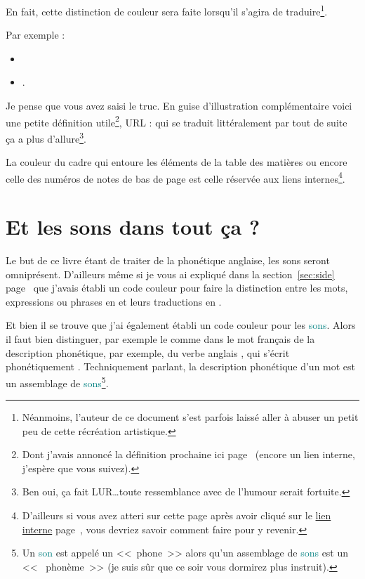 En fait, cette distinction de couleur sera faite lorsqu'il s'agira de
traduire\footnote{Néanmoins, l'auteur de ce document s'est parfois 
  laissé aller à abuser un petit peu de cette récréation artistique.}.

Par exemple :
\begin{itemize}
\item {}
\item {}.  
\end{itemize}

Je pense que vous avez saisi le truc. En guise d'illustration
complémentaire voici une petite définition utile\footnote{Dont j'avais
annoncé la définition prochaine ici page~\pageref{sec:link} (encore un
lien interne, j'espère que vous suivez).}, URL :  qui se traduit littéralement par
 tout de suite ça a plus
d'allure\footnote{Ben oui, ça fait LUR\dots toute ressemblance avec de
  l'humour serait fortuite.}.

La couleur du cadre qui entoure les éléments de la table des matières
ou encore celle des numéros de notes de bas de page est celle réservée
aux \hypertarget{linkin}{liens internes}\footnote{D'ailleurs si vous
  avez atteri sur cette page après avoir cliqué sur le
  \hyperlink{retour}{lien interne} page~\pageref{retour}, vous devriez
savoir comment faire pour y revenir.}. 

\newpage

\section{Et les sons dans tout ça ?}\label{sec:phonetics}

Le but de ce livre étant de traiter de la phonétique anglaise, les
sons seront omniprésent. D'ailleurs même si je vous ai expliqué dans
la section~\ref{sec:side} page~\pageref{sec:side} que j'avais établi un code
couleur pour faire la distinction entre les mots, expressions ou
phrases en  et leurs traductions en .

Et bien il se trouve que j'ai également établi un code couleur pour
les \textcolor{teal}{sons}. Alors il faut bien distinguer, par exemple
le comme dans le mot français  de la
description phonétique, par exemple, du verbe anglais , qui
s'écrit phonétiquement . Techniquement parlant, la
description phonétique d'un mot est un assemblage de
\textcolor{teal}{sons}\footnote{Un \textcolor{teal}{son} est appelé un
<<~phone~>> alors qu'un assemblage de \textcolor{teal}{sons} est un <<~
phonème~>> (je suis sûr que ce soir vous dormirez plus instruit).}.


